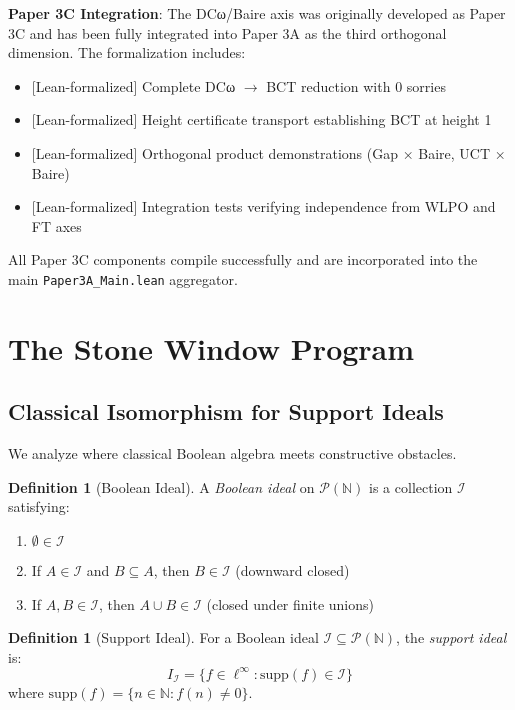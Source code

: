 \documentclass[11pt]{article}
\theoremstyle{plain}
\theoremstyle{definition}
\newtheorem{definition}[theorem]{Definition}
\newcommand{\N}{\mathbb{N}}
\newcommand{\linf}{\ell^\infty}
\newcommand{\leanok}{\textsf{\textcolor{green!70!black}{[Lean-formalized]}}}
\begin{document}
\begin{formalbox}
\textbf{Paper 3C Integration}: The DCω/Baire axis was originally developed as Paper 3C and has been fully integrated into Paper 3A as the third orthogonal dimension. The formalization includes:
\begin{itemize}
\item \leanok{} Complete DCω $\rightarrow$ BCT reduction with 0 sorries
\item \leanok{} Height certificate transport establishing BCT at height 1
\item \leanok{} Orthogonal product demonstrations (Gap × Baire, UCT × Baire)
\item \leanok{} Integration tests verifying independence from WLPO and FT axes
\end{itemize}
All Paper 3C components compile successfully and are incorporated into the main \texttt{Paper3A\_Main.lean} aggregator.
\end{formalbox}

\section{The Stone Window Program}

\subsection{Classical Isomorphism for Support Ideals}

We analyze where classical Boolean algebra meets constructive obstacles.

\begin{definition}[Boolean Ideal]\label{def:bool-ideal}
A \emph{Boolean ideal} on $\mathcal{P}(\N)$ is a collection $\mathcal{I}$ satisfying:
\begin{enumerate}
\item $\emptyset \in \mathcal{I}$
\item If $A \in \mathcal{I}$ and $B \subseteq A$, then $B \in \mathcal{I}$ (downward closed)
\item If $A, B \in \mathcal{I}$, then $A \cup B \in \mathcal{I}$ (closed under finite unions)
\end{enumerate}
\end{definition}

\begin{definition}[Support Ideal]\label{def:support-ideal}
For a Boolean ideal $\mathcal{I} \subseteq \mathcal{P}(\N)$, the \emph{support ideal} is:
\[
I_{\mathcal{I}} = \{f \in \linf : \text{supp}(f) \in \mathcal{I}\}
\]
where $\text{supp}(f) = \{n \in \N : f(n) \neq 0\}$.
\end{definition}
\end{document}
